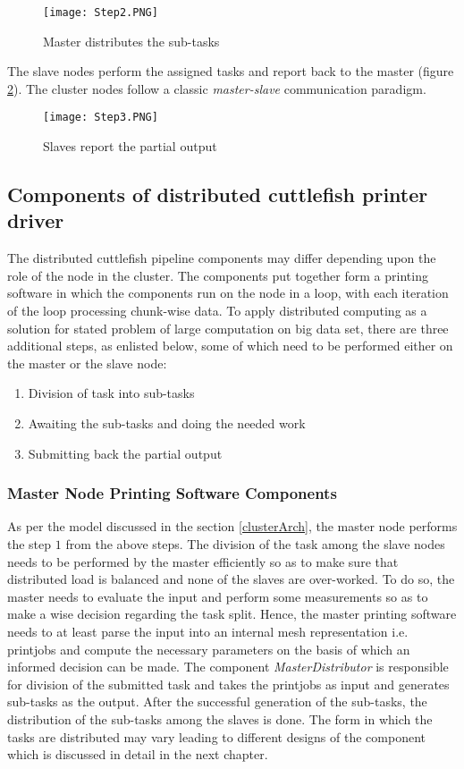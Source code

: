 \begin{figure}[ht!]
\centering
\texttt{[image: Step2.PNG]}
\caption{Master distributes the sub-tasks}
\label{fig:Step2}
\end{figure}

The slave nodes perform the assigned tasks and report back to the master (figure \ref{fig:Step3}). The cluster nodes follow a classic \textit{master-slave} communication paradigm. 

\begin{figure}[ht!]
\centering
\texttt{[image: Step3.PNG]}
\caption{Slaves report the partial output}
\label{fig:Step3}
\end{figure}

\subsection{Components of distributed cuttlefish printer driver} \label{DSCuttlefish}

The distributed cuttlefish pipeline components may differ depending upon the role of the node in the cluster. The components put together form a printing software in which the components run on the node in a loop, with each iteration of the loop processing chunk-wise data. To apply distributed computing as a solution for stated problem of large computation on big data set, there are three additional steps, as enlisted below, some of which need to be performed either on the master or the slave node:  
\begin{enumerate}
\item Division of task into sub-tasks 
\item Awaiting the sub-tasks and doing the needed work
\item Submitting back the partial output
\end{enumerate}

\subsubsection{Master Node Printing Software Components}
As per the model discussed in the section \ref{clusterArch}, the master node performs the step $1$ from the above steps. The division of the task among the slave nodes needs to be performed by the master efficiently so as to make sure that distributed load is balanced and none of the slaves are over-worked. To do so, the master needs to evaluate the input and perform some measurements so as to make a wise decision regarding the task split. Hence, the master printing software needs to at least parse the input into an internal mesh representation i.e. printjobs and compute the necessary parameters on the basis of which an informed decision can be made. The component \textit{MasterDistributor} is responsible for division of the submitted task and takes the printjobs as input and generates sub-tasks as the output. After the successful generation of the sub-tasks, the distribution of the sub-tasks among the slaves is done. The form in which the tasks are distributed may vary leading to different designs of the component which is discussed in detail in the next chapter. 

